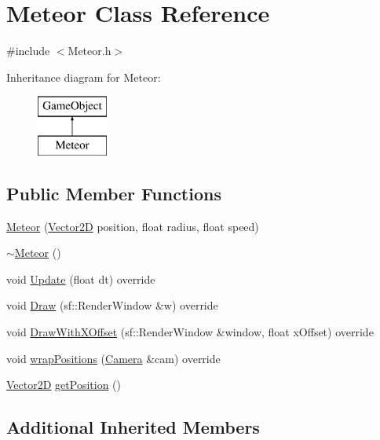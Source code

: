 \hypertarget{class_meteor}{}\section{Meteor Class Reference}
\label{class_meteor}


{\ttfamily \#include $<$Meteor.\+h$>$}

Inheritance diagram for Meteor\+:\begin{figure}[H]
\begin{center}
\leavevmode
\includegraphics[height=2.000000cm]{class_meteor}
\end{center}
\end{figure}
\subsection*{Public Member Functions}
\begin{DoxyCompactItemize}
\item 
\hyperlink{class_meteor_ac3d2e6e2ed8395a62173117f283c0770}{Meteor} (\hyperlink{class_vector2_d}{Vector2D} position, float radius, float speed)
\item 
\hyperlink{class_meteor_aa4bfbce9a06fa010a5ef5213772efad8}{$\sim$\+Meteor} ()
\item 
void \hyperlink{class_meteor_ab8f7e0d8ded9f7cf368db7841376fba6}{Update} (float dt) override
\item 
void \hyperlink{class_meteor_a426244847c2446f36016c4b06713ce10}{Draw} (sf\+::\+Render\+Window \&w) override
\item 
void \hyperlink{class_meteor_a6b3dc73ecbbf31c6869f7e79e0e266cc}{Draw\+With\+X\+Offset} (sf\+::\+Render\+Window \&window, float x\+Offset) override
\item 
void \hyperlink{class_meteor_a49fe47a23c6622f9850e81eac5c53ec2}{wrap\+Positions} (\hyperlink{class_camera}{Camera} \&cam) override
\item 
\hyperlink{class_vector2_d}{Vector2D} \hyperlink{class_meteor_a28b006ae1f193fd0d0b3c2c19b82c278}{get\+Position} ()
\end{DoxyCompactItemize}
\subsection*{Additional Inherited Members}


